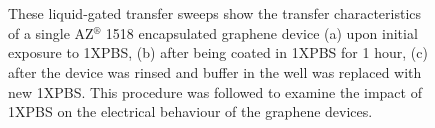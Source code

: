 \documentclass[
  a4paper,
]{scrbook}
\begin{document}
\begin{figure}
\begin{minipage}[t]{0.47\linewidth}
{{}

}

\subcaption{\label{fig-subthreshold-slope}}
\end{minipage}%
\newline
\begin{minipage}[t]{0.26\linewidth}

{\centering 

~

}

\end{minipage}%
%
\begin{minipage}[t]{0.47\linewidth}

{\centering 


}

\subcaption{\label{fig-threshold-voltage}}
\end{minipage}%
%
\begin{minipage}[t]{0.26\linewidth}

{\centering 

~

}

\end{minipage}%

\caption{\label{fig-pristine-graphene}These liquid-gated transfer sweeps
show the transfer characteristics of a single AZ\(^\circledR\) 1518
encapsulated graphene device (a) upon initial exposure to 1XPBS, (b)
after being coated in 1XPBS for 1 hour, (c) after the device was rinsed
and buffer in the well was replaced with new 1XPBS. This procedure was
followed to examine the impact of 1XPBS on the electrical behaviour of
the graphene devices.}

\end{figure}
\end{document}
